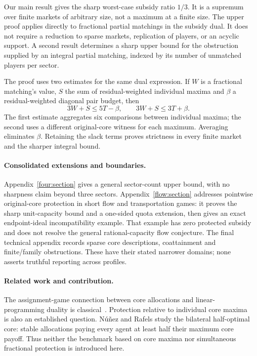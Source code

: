 \documentclass[11pt]{article}
\theoremstyle{remark}
\begin{document}
Our main result gives the sharp worst-case subsidy ratio $1/3$. It is a
supremum over finite markets of arbitrary size, not a maximum at a finite
size. The upper proof applies directly to fractional partial matchings in
the subsidy dual. It does not require a reduction to sparse markets,
replication of players, or an acyclic support. A second result determines a
sharp upper bound for the obstruction supplied by an integral partial
matching, indexed by its number of unmatched players per sector.

The proof uses two estimates for the same dual expression. If $W$ is a
fractional matching's value, $S$ the sum of residual-weighted individual
maxima and $\beta$ a residual-weighted diagonal pair budget, then
\[
                 3W+S\le5T-\beta,
        \qquad   3W+S\le3T+\beta.
\]
The first estimate aggregates six comparisons between individual maxima;
the second uses a different original-core witness for each maximum.
Averaging eliminates $\beta$. Retaining the slack terms proves strictness in
every finite market and the sharper integral bound.

\paragraph{Consolidated extensions and boundaries.}
Appendix~\ref{four:section} gives a general sector-count upper bound, with no
sharpness claim beyond three sectors. Appendix~\ref{flow:section} addresses
pointwise original-core protection in short flow and transportation games:
it proves the sharp unit-capacity bound and a one-sided quota extension,
then gives an exact endpoint-ideal incompatibility example. That example has
zero protected subsidy and does not resolve the general rational-capacity
flow conjecture. The final technical appendix records sparse core descriptions,
coattainment and finite/family obstructions. These have their stated narrower
domains; none asserts truthful reporting across profiles.

\paragraph{Related work and contribution.}
The assignment-game connection between core allocations and linear-programming
duality is classical~\cite{ShapleyShubik1971}. Protection relative to individual
core maxima is also an established question. N\'u\~nez and Rafels
\cite[Definition~6]{NunezRafels2004} study the bilateral half-optimal core:
stable allocations paying every agent at least half their maximum core
payoff. Thus neither the benchmark based on core maxima nor simultaneous
fractional protection is introduced here.
\end{document}
